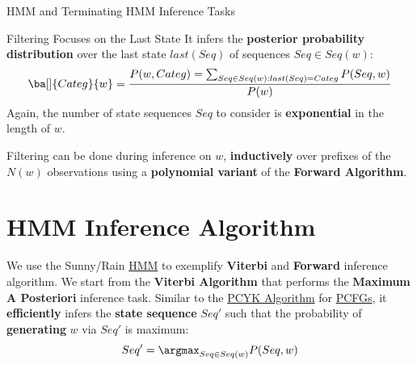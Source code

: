 \begin{example}{HMM and Terminating HMM Inference Tasks}{}
\begin{example}{Filtering Focuses on the Last State}{}
        It infers the \textbf{posterior probability distribution} over the last state $last(Seq)$ of sequences $Seq\in Seq(w)$:
        \[
            \ba[]{Categ}{w} = \frac{P(w,Categ) = \sum_{Seq\in Seq(w):last(Seq) = Categ}P(Seq,w)}{P(w)}
        \]
        Again, the number of state sequences $Seq$ to consider is \textbf{exponential} in the length of $w$.
        \begin{note}[Actually]
            Filtering can be done during inference on $w$, \textbf{inductively} over prefixes of the $N(w)$ observations using a \textbf{polynomial variant} of the \textbf{Forward Algorithm}.
        \end{note}
    \end{example}
\end{example}
%
\section{HMM Inference Algorithm}\label{sec:in_hmm_inference_algorithm} %
We use the Sunny/Rain \hyperref[def:hmm]{HMM} to exemplify \textbf{Viterbi} and \textbf{Forward} inference algorithm.
\emptyln{}
We start from the \textbf{Viterbi Algorithm} that performs the \textbf{Maximum A Posteriori} inference task.
Similar to the \hyperref[sub:in_pcyk_algorithm]{PCYK Algorithm} for \hyperref[def:pcfg]{PCFGs}, it \textbf{efficiently} infers the \textbf{state sequence} $Seq'$ such that the probability of \textbf{generating} $w$ via $Seq'$ is maximum:
\[
    Seq' = \argmax_{Seq\in Seq(w)}P(Seq,w)
\]
\begin{tip}[Computational Complexity: $O(n)$ with $n = |w|$]
\end{tip}
%
